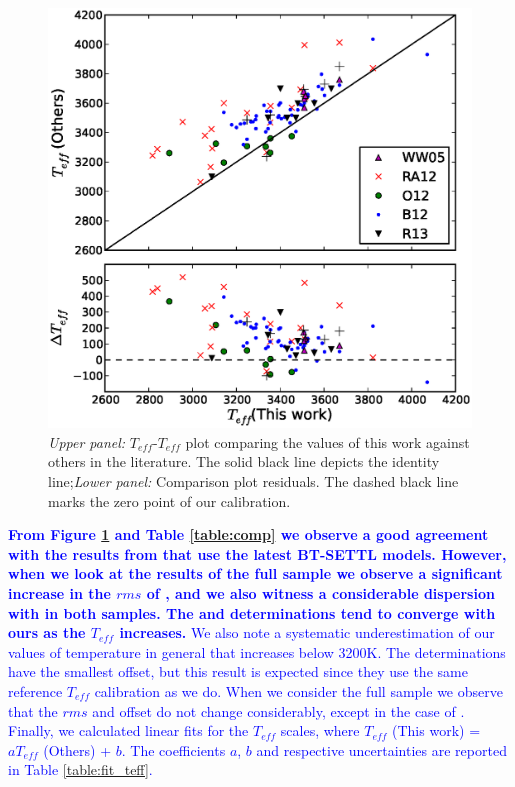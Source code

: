 \documentclass{aa}
\begin{document}
\begin{figure}[]
\begin{center}
\includegraphics[scale=0.5]{pics/compteffv3.eps}
\end{center}
\caption{\textit{Upper panel:} $T_{eff}$-$T_{eff}$ plot comparing the values of this work against others in the literature. The solid black line depicts the identity line;\textit{Lower panel:} Comparison plot residuals. The dashed black line marks the zero point of our calibration.}
\label{fig:compteff}
\end{figure}

\textcolor{blue}{\textbf{From Figure \ref{fig:compteff} and Table \ref{table:comp} we observe a good agreement with the results from \citet{Rajpurohit-2013a} that use the latest BT-SETTL models. However, when we look at the results of the full sample we observe a significant increase in the $rms$ of \citet{Rajpurohit-2013a}, and we also witness a considerable dispersion with \citet{Rojas-Ayala-2012} in both samples. The \citet{Onehag-2012} and \citet{Boyajian-2012} determinations tend to converge with ours as the $T_{eff}$ increases.}} 
\textcolor{blue}{We also note a systematic underestimation of our values of temperature in general that increases below 3200K. The \citet{Onehag-2012} determinations have the smallest offset, but this result is expected since they use the same reference $T_{eff}$ calibration as we do. When we consider the full sample we observe that the $rms$ and offset do not change considerably, except in the case of \citet{Rajpurohit-2013a}.}
\textcolor{blue}{Finally, we calculated linear fits for the $T_{eff}$ scales, where $T_{eff}$ (This work) = $aT_{eff}$ (Others) + $b$. The coefficients $a$, $b$ and respective uncertainties are reported in Table \ref{table:fit_teff}. 
}
\end{document}
